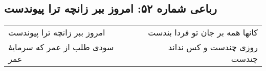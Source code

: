 \begin{center}
\section*{رباعی شماره ۵۲: امروز ببر زانچه ترا پیوندست}
\label{sec:sh052}
\begin{longtable}{l p{0.5cm} r}
امروز ببر زانچه ترا پیوندست
&&
کانها همه بر جان تو فردا بندست
\\
سودی طلب از عمر که سرمایهٔ عمر
&&
روزی چندست و کس نداند چندست
\\
\end{longtable}
\end{center}
